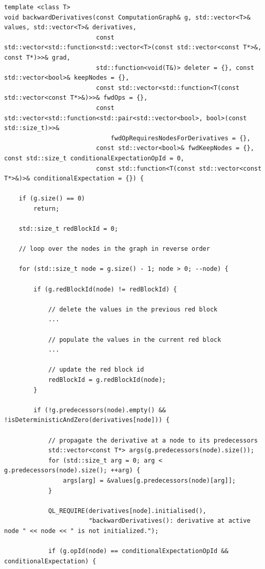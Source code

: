 \documentclass[12pt, a4paper]{report}
\begin{document}
\begin{listing}
\begin{verbatim}
template <class T>
void backwardDerivatives(const ComputationGraph& g, std::vector<T>& values, std::vector<T>& derivatives,
                         const std::vector<std::function<std::vector<T>(const std::vector<const T*>&, const T*)>>& grad,
                         std::function<void(T&)> deleter = {}, const std::vector<bool>& keepNodes = {},
                         const std::vector<std::function<T(const std::vector<const T*>&)>>& fwdOps = {},
                         const std::vector<std::function<std::pair<std::vector<bool>, bool>(const std::size_t)>>&
                             fwdOpRequiresNodesForDerivatives = {},
                         const std::vector<bool>& fwdKeepNodes = {}, const std::size_t conditionalExpectationOpId = 0,
                         const std::function<T(const std::vector<const T*>&)>& conditionalExpectation = {}) {

    if (g.size() == 0)
        return;

    std::size_t redBlockId = 0;

    // loop over the nodes in the graph in reverse order

    for (std::size_t node = g.size() - 1; node > 0; --node) {

        if (g.redBlockId(node) != redBlockId) {

            // delete the values in the previous red block
            ...

            // populate the values in the current red block
            ...

            // update the red block id
            redBlockId = g.redBlockId(node);
        }

        if (!g.predecessors(node).empty() && !isDeterministicAndZero(derivatives[node])) {

            // propagate the derivative at a node to its predecessors
            std::vector<const T*> args(g.predecessors(node).size());
            for (std::size_t arg = 0; arg < g.predecessors(node).size(); ++arg) {
                args[arg] = &values[g.predecessors(node)[arg]];
            }

            QL_REQUIRE(derivatives[node].initialised(),
                       "backwardDerivatives(): derivative at active node " << node << " is not initialized.");

            if (g.opId(node) == conditionalExpectationOpId && conditionalExpectation) {


\end{verbatim}
\end{listing}
\end{document}
